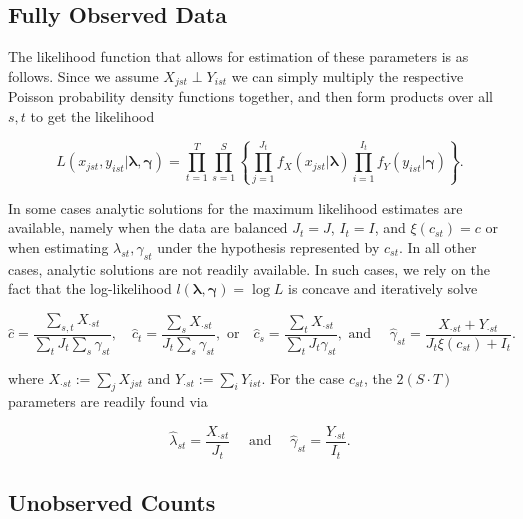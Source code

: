 \subsection*{Fully Observed Data}

The likelihood function that allows for estimation of these parameters is as follows.  Since we assume $X_{jst} \perp Y_{ist}$ we can simply multiply the respective Poisson probability density functions together, and then form products over all $s,t$ to get the likelihood 

\begin{equation}
  \label{eq:likelihood}
  L(x_{jst}, y_{ist} |\boldsymbol{\lambda}, \boldsymbol{\gamma}) = \prod_{t = 1}^{T} \prod_{s=1}^S \left\{ \prod_{j=1}^{J_t} f_X(x_{jst}|\boldsymbol{\lambda}) \prod_{i=1}^{I_t} f_Y(y_{ist} | \boldsymbol{\gamma}) \right\}.
\end{equation}

\noindent In some cases analytic solutions for the maximum likelihood estimates are available, namely when the data are balanced $J_t = J$, $I_t = I$, and $\xi(c_{st}) = c$ or when estimating $\lambda_{st}, \gamma_{st}$ under the hypothesis represented by $c_{st}$.  In all other cases, analytic solutions are not readily available.  In such cases, we rely on the fact that the log-likelihood $l(\boldsymbol{\lambda}, \boldsymbol{\gamma}) = \log{L}$ is concave and iteratively solve 

\begin{equation*}
  \hat{c} = \frac{\sum_{s,t} X_{\cdot st}}{\sum_t J_t \sum_s \gamma_{st}}, \quad \hat{c}_t =  \frac{\sum_s X_{\cdot st}}{J_t \sum_s \gamma_{st}}, \text{ or} \quad \hat{c}_s = \frac{\sum_{t}X_{\cdot st}}{\sum_t J_t \gamma_{st}}, \text{ and } \quad \hat{\gamma}_{st} = \frac{X_{\cdot st} + Y_{\cdot st}}{J_t\xi(c_{st}) + I_t}.
\end{equation*}

\noindent where $X_{\cdot st} := \sum_{j}X_{jst}$ and $Y_{\cdot st} := \sum_{i} Y_{ist}$.  For the case $c_{st}$, the $2(S \cdot T)$ parameters are readily found via

\begin{equation*}
  \hat{\lambda}_{st} = \frac{X_{\cdot st}}{J_t} \quad \text{ and } \quad \hat{\gamma}_{st} = \frac{Y_{\cdot st}}{I_t}.
\end{equation*}

\subsection*{Unobserved Counts}

